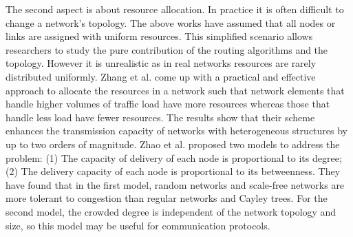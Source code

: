 \documentclass[onecolumn,preprintnumbers,amsmath,amssymb]{revtex4}
\begin{document}
The second aspect is about resource allocation.
In practice it is often difficult to change a network’s topology. The above works have assumed that all nodes or links are assigned with uniform resources. 
This simplified scenario allows researchers to study the pure contribution of the routing algorithms and the topology. However it is unrealistic as in real networks resources are rarely distributed uniformly.
Zhang et al. come up with a practical and effective approach to allocate the resources in a network such that network elements that handle higher volumes of traffic load have more resources whereas those that handle less load have fewer resources. The results show that their scheme enhances the transmission capacity of networks with heterogeneous structures by up to two orders of magnitude\cite{GQZ}.
Zhao et al. proposed two models to address the problem: (1) The capacity of delivery of each node is proportional to its degree; (2) The delivery capacity of each node is proportional to its betweenness. They have found that in the first model, random networks and scale-free networks are more tolerant to congestion than regular networks and Cayley trees. For the second model, the crowded degree is independent of the network topology and size, so this model may be useful for communication protocols\cite{LZY}.
\end{document}
